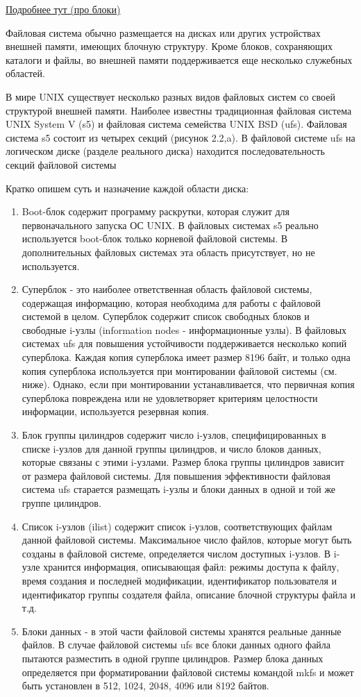 \documentclass{article}
\begin{document}
\href{https://docstore.mik.ua/unix2/glava_13.htm}{Подробнее тут (про блоки)}

Файловая система обычно размещается на дисках или других устройствах внешней памяти, имеющих блочную структуру. Кроме блоков, сохраняющих каталоги и файлы, во внешней памяти поддерживается еще несколько служебных областей. 

В мире UNIX существует несколько разных видов файловых систем со своей структурой внешней памяти. Наиболее известны традиционная файловая система UNIX System V (s5) и файловая система семейства UNIX BSD (ufs). Файловая система s5 состоит из четырех секций (рисунок 2.2,a). В файловой системе ufs на логическом диске (разделе реального диска) находится последовательность секций файловой системы 

Кратко опишем суть и назначение каждой области диска:
\begin{enumerate}
	\item Boot-блок содержит программу раскрутки, которая служит для первоначального запуска ОС UNIX. В файловых системах s5 реально используется boot-блок только корневой файловой системы. В дополнительных файловых системах эта область присутствует, но не используется.
	\item Суперблок - это наиболее ответственная область файловой системы, содержащая информацию, которая необходима для работы с файловой системой в целом. Суперблок содержит список свободных блоков и свободные i-узлы (information nodes - информационные узлы). В файловых системах ufs для повышения устойчивости поддерживается несколько копий суперблока. Каждая копия суперблока имеет размер 8196 байт, и только одна копия суперблока используется при монтировании файловой системы (см. ниже). Однако, если при монтировании устанавливается, что первичная копия суперблока повреждена или не удовлетворяет критериям целостности информации, используется резервная копия. 
	\item Блок группы цилиндров содержит число i-узлов, специфицированных в списке i-узлов для данной группы цилиндров, и число блоков данных, которые связаны с этими i-узлами. Размер блока группы цилиндров зависит от размера файловой системы. Для повышения эффективности файловая система ufs старается размещать i-узлы и блоки данных в одной и той же группе цилиндров. 
	\item Список i-узлов (ilist) содержит список i-узлов, соответствующих файлам данной файловой системы. Максимальное число файлов, которые могут быть созданы в файловой системе, определяется числом доступных i-узлов. В i-узле хранится информация, описывающая файл: режимы доступа к файлу, время создания и последней модификации, идентификатор пользователя и идентификатор группы создателя файла, описание блочной структуры файла и т.д.
	\item Блоки данных - в этой части файловой системы хранятся реальные данные файлов. В случае файловой системы ufs все блоки данных одного файла пытаются разместить в одной группе цилиндров. Размер блока данных определяется при форматировании файловой системы командой mkfs и может быть установлен в 512, 1024, 2048, 4096 или 8192 байтов. 
\end{enumerate}
\end{document}
